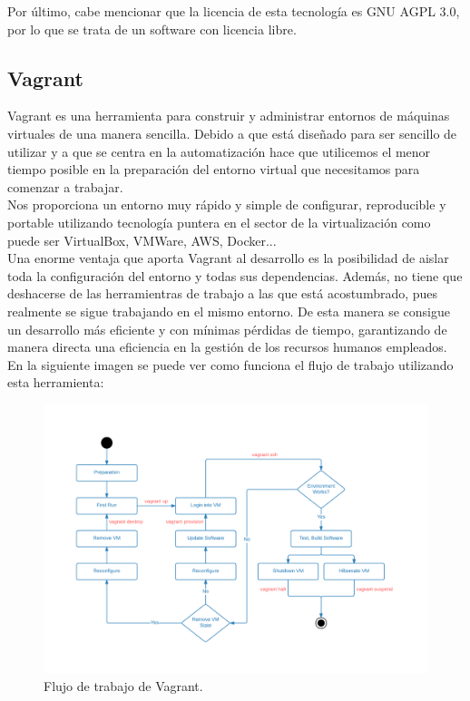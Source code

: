 Por último, cabe mencionar que la licencia de esta tecnología es GNU AGPL 3.0\cite{agpl}, por lo que se trata de un software con licencia
libre.



\subsection{Vagrant}

Vagrant es una herramienta para construir y administrar entornos de máquinas virtuales de una 
manera sencilla. Debido a que está diseñado para ser sencillo de utilizar y a que se centra en 
la automatización hace que utilicemos el menor tiempo posible en la preparación del entorno virtual
que necesitamos para comenzar a trabajar.\\

Nos proporciona un entorno muy rápido y simple de configurar, reproducible y portable utilizando
tecnología puntera en el sector de la virtualización como puede ser VirtualBox, VMWare, AWS, Docker...\\

Una enorme ventaja que aporta Vagrant al desarrollo es la posibilidad de aislar toda la configuración
del entorno y todas sus dependencias. Además, no tiene que deshacerse de las herramientras de trabajo
a las que está acostumbrado, pues realmente se sigue trabajando en el mismo entorno. 
De esta manera se consigue un desarrollo más eficiente y con mínimas pérdidas de tiempo, garantizando 
de manera directa una eficiencia en la gestión de los recursos humanos empleados.\\

En la siguiente imagen se puede ver como funciona el flujo de trabajo utilizando esta herramienta:

\begin{figure}[H]
	\centering
	\includegraphics[scale=0.65]{imagenes/vagrant-workflow.png}
	\caption{Flujo de trabajo de Vagrant. \label{fig:figura6}}
\end{figure}

